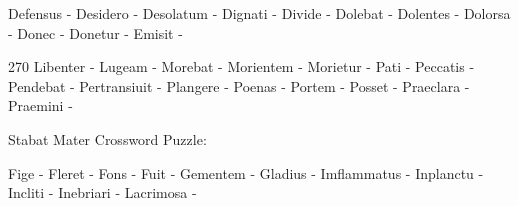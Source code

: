 \documentclass[12pt]{article}
\begin{document}
\pagestyle{fancy}
\fancyhf{}
\renewcommand{\headrulewidth}{0pt}
\renewcommand{\footrulewidth}{0pt}
\libertine
\renewcommand\PuzzleClueFont{\rm\normalsize}
\begin{rotate}{0}
\small  Defensus - Desidero - Desolatum - Dignati - Divide - Dolebat - Dolentes - Dolorsa - Donec - Donetur - Emisit -

\end{rotate}
\hfill
\noindent\begin{rotate}{270}
\small Libenter - Lugeam - Morebat - Morientem - Morietur - Pati - Peccatis - Pendebat - Pertransiuit - Plangere - Poenas - Portem - Posset - Praeclara - Praemini - 

\end{rotate}
\begin{center}
  \huge{Stabat Mater Crossword Puzzle:}
\end{center}

\small  Fige - Fleret - Fons - Fuit - Gementem - Gladius - Imflammatus - Inplanctu - Incliti - Inebriari - Lacrimosa - 
\end{document}
